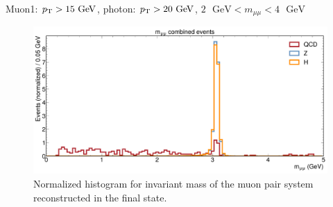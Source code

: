\documentclass[aspectratio = 1610, xcolor = dvipsnames]{beamer}
\newcommand{\GeV}{\textrm{ }\mathrm{GeV}}
\newcommand{\pt}{p_{\rm T}}
\begin{document}

    \begin{frame}[t]{Muon1: $\pt > 15\GeV$, photon: $\pt>20\GeV$, $2\GeV<m_{\mu\mu}<4\GeV$}
    
        \begin{figure}[c]
            \centering
            \includegraphics[width=.8\textwidth]{images/m_mumu_combined_TestForCut.pdf}
            \caption{Normalized histogram for invariant mass of the muon pair system reconstructed in the final state. \label{im:m_mumu_combined_TestForCut}}
        \end{figure}

    \end{frame}

    
\end{document}
